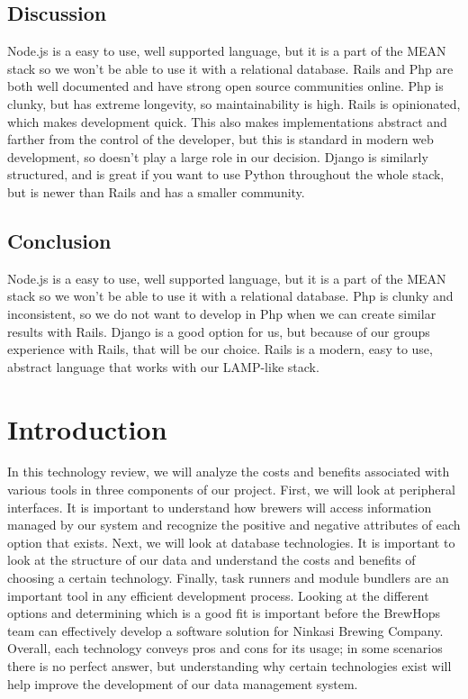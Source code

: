 \documentclass[draftclsnofoot,onecolumn,letterpaper,10pt,compsoc]{IEEEtran}
\begin{document}
				\subsection{Discussion}
				Node.js is a easy to use, well supported language, but it is a part of the MEAN stack so we won’t be able to use it with a relational database.
				Rails and Php are both well documented and have strong open source communities online.
				Php is clunky, but has extreme longevity, so maintainability is high.
				Rails is opinionated, which makes development quick.
				This also makes implementations abstract and farther from the control of the developer, but this is standard in modern web development, so doesn't play a large role in our decision.
        Django is similarly structured, and is great if you want to use Python throughout the whole stack, but is newer than Rails and has a smaller community.

				\subsection{Conclusion}
				Node.js is a easy to use, well supported language, but it is a part of the MEAN stack so we won’t be able to use it with a relational database.
				Php is clunky and inconsistent, so we do not want to develop in Php when we can create similar results with Rails.
        Django is a good option for us, but because of our groups experience with Rails, that will be our choice.
				Rails is a modern, easy to use, abstract language that works with our LAMP-like stack. 

		\clearpage

		\section{Introduction}
		In this technology review, we will analyze the costs and benefits associated with various tools in three components of our project.
		First, we will look at peripheral interfaces.
		It is important to understand how brewers will access information managed by our system and recognize the positive and negative attributes of each option that exists.
		Next, we will look at database technologies.
		It is important to look at the structure of our data and understand the costs and benefits of choosing a certain technology.
		Finally, task runners and module bundlers are an important tool in any efficient development process.
		Looking at the different options and determining which is a good fit is important before the BrewHops team can effectively develop a software solution for Ninkasi Brewing Company.
		Overall, each technology conveys pros and cons for its usage; in some scenarios there is no perfect answer, but understanding why certain technologies exist will help improve the development of our data management system.
\end{document}
